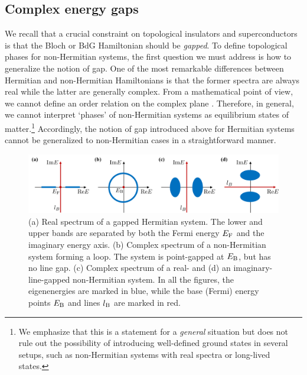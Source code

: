 \documentclass{tADP2e}
\theoremstyle{plain}
\theoremstyle{plain}
\theoremstyle{definition}
\begin{document}
\subsection{Complex energy gaps}\label{ceg}
We recall that a crucial constraint on topological insulators and superconductors is that the Bloch or BdG Hamiltonian should be \emph{gapped}. 
To define topological phases for non-Hermitian systems, the first question we must address is how to generalize the notion of gap. One of the most remarkable differences between Hermitian and non-Hermitian Hamiltonians is that the former spectra are always real while the latter are generally complex. From a mathematical point of view, we cannot define an order relation on the complex plane \cite{LVA79}. Therefore, in general, we cannot interpret `phases' of non-Hermitian systems as equilibrium states of matter.\footnote{We emphasize that this is a statement for a \emph{general} situation but does not rule out the possibility of introducing well-defined ground states in several setups, such as non-Hermitian systems with real spectra or long-lived states.} 
Accordingly, the notion of gap introduced above for Hermitian systems cannot be generalized to non-Hermitian cases in a straightforward manner.

\begin{figure}[!t]
\begin{center}
\includegraphics[width=14.5cm]{./Figures/fig_5_gap.pdf}
\end{center}
\caption{(a) Real spectrum of a gapped Hermitian system. The lower and upper bands are separated by both the Fermi energy $E_{\rm F}$ and the imaginary energy axis. (b) Complex spectrum of a non-Hermitian system forming a loop. The system is point-gapped at $E_{\rm B}$, but has no line gap. (c) Complex spectrum of a real- and (d) an imaginary-line-gapped non-Hermitian system. 
In all the figures, the eigenenergies are marked in blue, while the base (Fermi) energy points $E_{\rm B}$ and lines $l_{\rm B}$ are marked in red.}
\label{fig:gap}
\end{figure}
\end{document}
